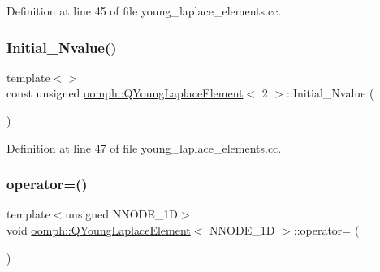 Definition at line 45 of file young\+\_\+laplace\+\_\+elements.\+cc.

\mbox{\label{classoomph_1_1QYoungLaplaceElement_a3597beefabf25fc881b4b5e4fbe4d143}} 
\subsubsection{\texorpdfstring{Initial\+\_\+\+Nvalue()}{Initial\_Nvalue()}\hspace{0.1cm}{\footnotesize\ttfamily [3/3]}}
{\footnotesize\ttfamily template$<$$>$ \\
const unsigned \hyperlink{classoomph_1_1QYoungLaplaceElement}{oomph\+::\+Q\+Young\+Laplace\+Element}$<$ 2 $>$\+::Initial\+\_\+\+Nvalue (\begin{DoxyParamCaption}{ }\end{DoxyParamCaption})\hspace{0.3cm}{\ttfamily [private]}}



Definition at line 47 of file young\+\_\+laplace\+\_\+elements.\+cc.

\mbox{\label{classoomph_1_1QYoungLaplaceElement_ab0a071ddac3ee5e94971db3c13877b64}} 
\subsubsection{\texorpdfstring{operator=()}{operator=()}}
{\footnotesize\ttfamily template$<$unsigned N\+N\+O\+D\+E\+\_\+1D$>$ \\
void \hyperlink{classoomph_1_1QYoungLaplaceElement}{oomph\+::\+Q\+Young\+Laplace\+Element}$<$ N\+N\+O\+D\+E\+\_\+1D $>$\+::operator= (\begin{DoxyParamCaption}\item[{const \hyperlink{classoomph_1_1QYoungLaplaceElement}{Q\+Young\+Laplace\+Element}$<$ N\+N\+O\+D\+E\+\_\+1D $>$ \&}]{ }\end{DoxyParamCaption})\hspace{0.3cm}{\ttfamily [inline]}}



